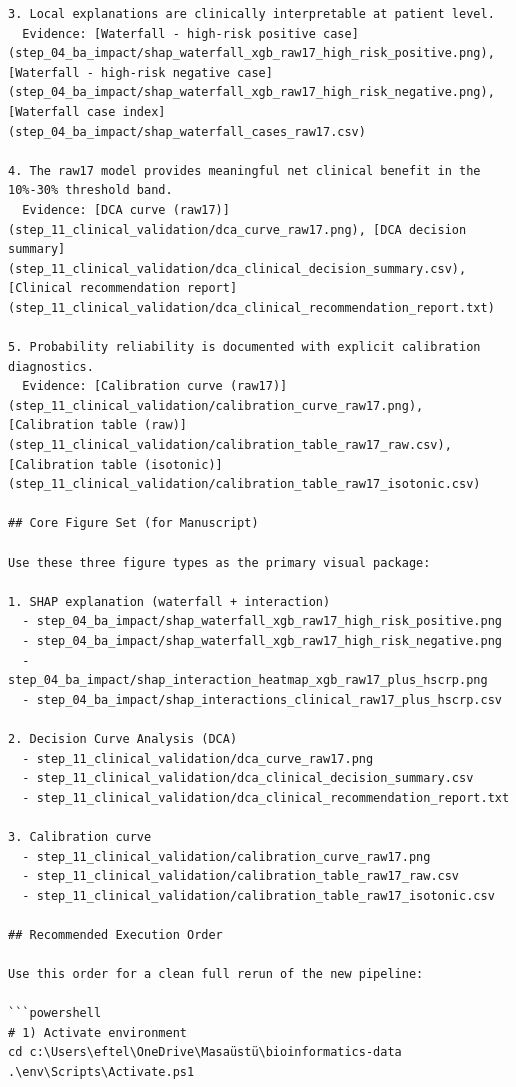 ﻿\documentclass[11pt,a4paper]{article}
\begin{document}
\begin{verbatim}
3. Local explanations are clinically interpretable at patient level.
  Evidence: [Waterfall - high-risk positive case](step_04_ba_impact/shap_waterfall_xgb_raw17_high_risk_positive.png), [Waterfall - high-risk negative case](step_04_ba_impact/shap_waterfall_xgb_raw17_high_risk_negative.png), [Waterfall case index](step_04_ba_impact/shap_waterfall_cases_raw17.csv)

4. The raw17 model provides meaningful net clinical benefit in the 10%-30% threshold band.
  Evidence: [DCA curve (raw17)](step_11_clinical_validation/dca_curve_raw17.png), [DCA decision summary](step_11_clinical_validation/dca_clinical_decision_summary.csv), [Clinical recommendation report](step_11_clinical_validation/dca_clinical_recommendation_report.txt)

5. Probability reliability is documented with explicit calibration diagnostics.
  Evidence: [Calibration curve (raw17)](step_11_clinical_validation/calibration_curve_raw17.png), [Calibration table (raw)](step_11_clinical_validation/calibration_table_raw17_raw.csv), [Calibration table (isotonic)](step_11_clinical_validation/calibration_table_raw17_isotonic.csv)

## Core Figure Set (for Manuscript)

Use these three figure types as the primary visual package:

1. SHAP explanation (waterfall + interaction)
  - step_04_ba_impact/shap_waterfall_xgb_raw17_high_risk_positive.png
  - step_04_ba_impact/shap_waterfall_xgb_raw17_high_risk_negative.png
  - step_04_ba_impact/shap_interaction_heatmap_xgb_raw17_plus_hscrp.png
  - step_04_ba_impact/shap_interactions_clinical_raw17_plus_hscrp.csv

2. Decision Curve Analysis (DCA)
  - step_11_clinical_validation/dca_curve_raw17.png
  - step_11_clinical_validation/dca_clinical_decision_summary.csv
  - step_11_clinical_validation/dca_clinical_recommendation_report.txt

3. Calibration curve
  - step_11_clinical_validation/calibration_curve_raw17.png
  - step_11_clinical_validation/calibration_table_raw17_raw.csv
  - step_11_clinical_validation/calibration_table_raw17_isotonic.csv

## Recommended Execution Order

Use this order for a clean full rerun of the new pipeline:

```powershell
# 1) Activate environment
cd c:\Users\eftel\OneDrive\Masaüstü\bioinformatics-data
.\env\Scripts\Activate.ps1


\end{verbatim}
\end{document}
